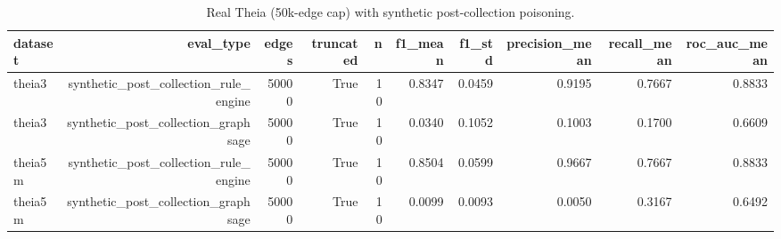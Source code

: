 \begin{table}[htbp]
\centering
\caption{Real Theia (50k-edge cap) with synthetic post-collection poisoning.}
\label{tab:darpa}
\begin{tabular}{lrrrrrrrrr}
\hline
dataset & eval_type & edges & truncated & n & f1_mean & f1_std & precision_mean & recall_mean & roc_auc_mean \\
\hline
theia3 & synthetic_post_collection_rule_engine & 50000 & True & 10 & 0.8347 & 0.0459 & 0.9195 & 0.7667 & 0.8833 \\
theia3 & synthetic_post_collection_graphsage & 50000 & True & 10 & 0.0340 & 0.1052 & 0.1003 & 0.1700 & 0.6609 \\
theia5m & synthetic_post_collection_rule_engine & 50000 & True & 10 & 0.8504 & 0.0599 & 0.9667 & 0.7667 & 0.8833 \\
theia5m & synthetic_post_collection_graphsage & 50000 & True & 10 & 0.0099 & 0.0093 & 0.0050 & 0.3167 & 0.6492 \\
\hline
\end{tabular}
\end{table}
